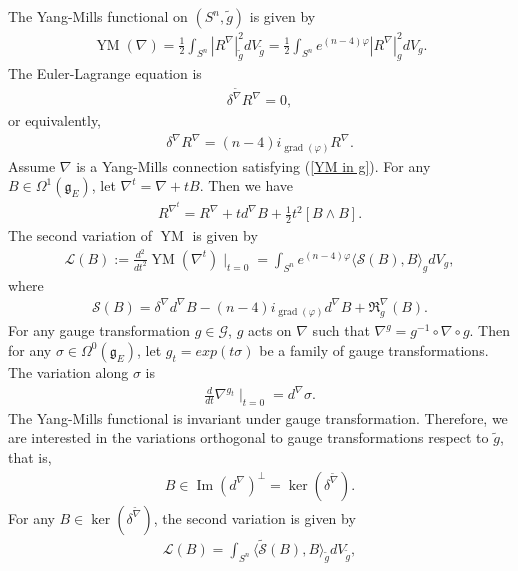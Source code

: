 \documentclass{amsart}
\begin{document}
	The Yang-Mills functional on $(S^n,\tilde g)$ is given by
	\begin{align}\label{YM functional}
		\operatorname{YM}(\nabla)=\frac12\int_{S^n}|R^\nabla|^2_{\tilde g}dV_{\tilde g}=\frac12\int_{S^n}e^{(n-4)\varphi}|R^\nabla|^2_gdV_g.
	\end{align}
	The Euler-Lagrange equation is
	\begin{align}\label{YM in tilde g}
		\delta^{\tilde\nabla}R^\nabla=0,
	\end{align}
	or equivalently,
	\begin{align}\label{YM in g}
		\delta^\nabla R^\nabla=(n-4)i_{\operatorname{grad}(\varphi)}R^\nabla.
	\end{align}
	Assume $\nabla$ is a Yang-Mills connection satisfying (\ref{YM in g}). For any $B\in\Omega^1(\mathfrak{g}_E)$, let $\nabla^t=\nabla+tB$. Then we have
	\begin{align*}
		R^{\nabla^t}=R^\nabla+td^\nabla B+\frac12t^2[B\wedge B].
	\end{align*}
	The second variation of $\operatorname{YM}$ is given by
	\begin{align}\label{2nd var}
		\mathscr{L}(B):=\frac{d^2}{dt^2}\operatorname{YM}(\nabla^t)\mid_{t=0}=\int_{S^n}e^{(n-4)\varphi}\langle\mathscr{S}(B),B\rangle_gdV_g,
	\end{align}
	where
	\begin{align*}
		\mathscr{S}(B)=\delta^\nabla d^\nabla B-(n-4)i_{\operatorname{grad}(\varphi)}d^\nabla B+\mathfrak{R}_g^\nabla(B).
	\end{align*}
	For any gauge transformation $g\in\mathcal{G}$, $g$ acts on $\nabla$ such that $\nabla^g=g^{-1}\circ\nabla\circ g$. Then for any $\sigma\in\Omega^0(\mathfrak{g}_E)$, let $g_t=exp(t\sigma)$ be a family of gauge transformations. The variation along $\sigma$ is
	\begin{align*}
		\frac{d}{dt}\nabla^{g_t}\mid_{t=0}=d^\nabla\sigma.
	\end{align*}
	The Yang-Mills functional is invariant under gauge transformation. Therefore, we are interested in the variations orthogonal to gauge transformations respect to $\tilde g$, that is,
	\begin{align*}
		B\in\operatorname{Im}(d^\nabla)^\perp=\operatorname{ker}(\delta^{\tilde\nabla}).
	\end{align*}
	For any $B\in\operatorname{ker}(\delta^{\tilde\nabla})$, the second variation is given by
	\begin{align*}
		\mathscr{L}(B)=\int_{S^n}\langle\tilde{\mathscr{S}}(B),B\rangle_{\tilde g}dV_{\tilde g},
	\end{align*}
\end{document}
